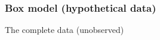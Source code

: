 \documentclass[handout]{beamer}
\begin{document}


   \begin{frame}
   \frametitle{Box model (hypothetical data)}
   \begin{center}
   \end{center}
   The complete data (unobserved)
   \end{frame}
\end{document}
